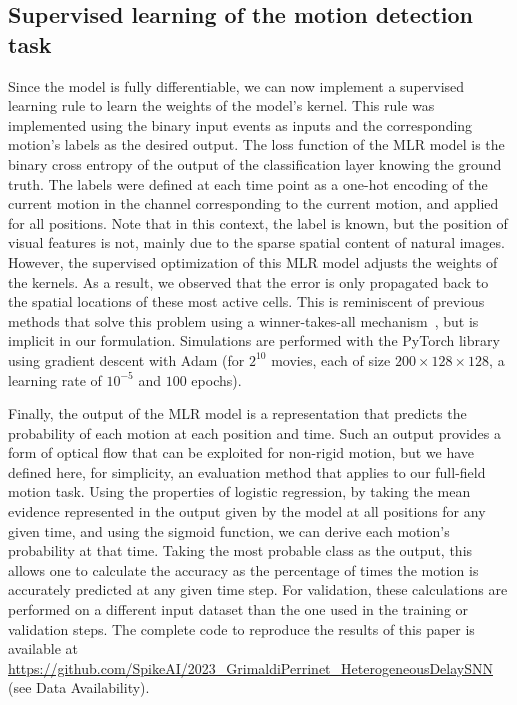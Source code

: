 \documentclass[default]{sn-jnl}%
\theoremstyle{thmstyleone}%
\theoremstyle{thmstyletwo}%
\theoremstyle{thmstylethree}%
\begin{document}
\subsection{Supervised learning of the motion detection task}
%
Since the model is fully differentiable, we can now implement a supervised learning rule to learn the weights of the model's kernel. This rule was implemented using the binary input events as inputs and the corresponding motion's labels as the desired output. The loss function of the MLR model is the binary cross entropy of the output of the classification layer knowing the ground truth. The labels were defined at each time point as a one-hot encoding of the current motion in the channel corresponding to the current motion, and applied for all positions. Note that in this context, the label is known, but the position of visual features is not, mainly due to the sparse spatial content of natural images. However, the supervised optimization of this MLR model adjusts the weights of the kernels. As a result, we observed that the error is only propagated back to the spatial locations of these most active cells. This is reminiscent of previous methods that solve this problem using a winner-takes-all mechanism~\citep{masquelier_unsupervised_2007}, but is implicit in our formulation. Simulations are performed with the PyTorch library using gradient descent with Adam (for $2^{10}$ movies, each of size $200 \times 128 \times 128$, a learning rate of $10^{-5}$ and $100$ epochs). %

Finally, the output of the MLR model is a representation that predicts the probability of each motion at each position and time. Such an output provides a form of optical flow that can be exploited for non-rigid motion, but we have defined here, for simplicity, an evaluation method that applies to our full-field motion task. 
Using the properties of logistic regression, by taking the mean evidence represented in the output given by the model at all positions for any given time, and using the sigmoid function, we can derive each motion's probability at that time. Taking the most probable class as the output, this allows one to calculate the accuracy as the percentage of times the motion is accurately predicted at any given time step. For validation, these calculations are performed on a different input dataset than the one used in the training or validation steps. The complete code to reproduce the results of this paper is available at \url{https://github.com/SpikeAI/2023_GrimaldiPerrinet_HeterogeneousDelaySNN} (see Data Availability). %
%
\end{document}
